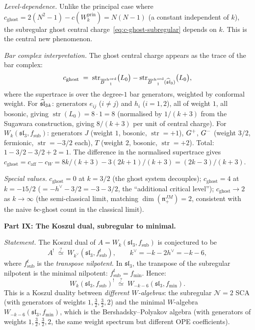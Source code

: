 \begin{computation}
\emph{Level-dependence.}
Unlike the principal case where
$c_{\mathrm{ghost}} = 2(N^2-1) - c(W_k^{\mathrm{prin}})
= N(N-1)$ (a constant independent of $k$), the subregular
ghost central charge~\eqref{eq:c-ghost-subregular} depends
on $k$. This is the central new phenomenon.

\emph{Bar complex interpretation.}
The ghost central charge appears as the trace of the bar
complex:
\begin{equation}\label{eq:c-ghost-bar-trace}
c_{\mathrm{ghost}}
\;=\;
\operatorname{str}_{{\overline{B}^{\mathrm{ch}}}^{\mathrm{ord}}_1}
\bigl(L_0\bigr)
-
\operatorname{str}_{{\overline{B}^{\mathrm{ch}}}^{\mathrm{ord}}_1(\widehat{\mathfrak{sl}}_3)}
\bigl(L_0\bigr),
\end{equation}
where the supertrace is over the degree-$1$ bar generators,
weighted by conformal weight.
For $\widehat{\mathfrak{sl}}_3{}_k$: generators $e_{ij}$ ($i\neq j$) and
$h_i$ ($i=1,2$), all of weight $1$, all bosonic, giving
$\operatorname{str}(L_0) = 8\cdot 1 = 8$ (normalised by
$1/(k+3)$ from the Sugawara construction, giving
$8/(k+3)$ per unit of central charge).
For $W_k(\mathfrak{sl}_3,f_{\mathrm{sub}})$: generators
$J$ (weight $1$, bosonic, $\operatorname{str}=+1$),
$G^+$, $G^-$ (weight $3/2$, fermionic,
$\operatorname{str}=-3/2$ each),
$T$ (weight $2$, bosonic, $\operatorname{str}=+2$).
Total: $1 - 3/2 - 3/2 + 2 = 1$.
The difference in the normalised supertrace gives
$c_{\mathrm{ghost}} = c_{\mathrm{aff}} - c_W
= 8k/(k+3) - 3(2k+1)/(k+3) = (2k-3)/(k+3)$.

\emph{Special values.}
$c_{\mathrm{ghost}}=0$ at $k=3/2$ (the ghost system decouples);
$c_{\mathrm{ghost}}=4$ at $k=-15/2$
($=-h^\vee - 3/2 = -3 - 3/2$, the ``additional critical
level'');
$c_{\mathrm{ghost}}\to 2$ as $k\to\infty$ (the
semi-classical limit, matching $\dim(\mathfrak n_+^{JM})=2$,
consistent with the naive $bc$-ghost count in the classical
limit).

\medskip
\noindent\textbf{Part IX: The Koszul dual, subregular
to minimal.}

\emph{Statement.}
The Koszul dual of
$A = W_k(\mathfrak{sl}_3,f_{\mathrm{sub}})$ is conjectured
to be
\begin{equation}\label{eq:koszul-dual-conjecture}
A^!\;\stackrel{?}{\simeq}\;
W_{k^\vee}(\mathfrak{sl}_3,f_{\mathrm{sub}}^t),
\qquad
k^\vee = -k - 2h^\vee = -k-6,
\end{equation}
where $f_{\mathrm{sub}}^t$ is the \emph{transpose
nilpotent}. In $\mathfrak{sl}_3$, the transpose of the
subregular nilpotent is the minimal nilpotent:
$f_{\mathrm{sub}}^t = f_{\min}$. Hence:
\begin{equation}\label{eq:koszul-dual-explicit}
W_k(\mathfrak{sl}_3,f_{\mathrm{sub}})^!
\;\stackrel{?}{\simeq}\;
W_{-k-6}(\mathfrak{sl}_3,f_{\min}).
\end{equation}
This is a Koszul duality between
\emph{different $W$-algebras}: the subregular
$\mathcal N=2$ SCA (with generators of weights
$1,\frac32,\frac32,2$) and the minimal $W$-algebra
$W_{-k-6}(\mathfrak{sl}_3,f_{\min})$, which is
the Bershadsky--Polyakov algebra (with generators of weights
$1,\frac32,\frac32,2$, the same weight spectrum but
different OPE coefficients).


\end{computation}
